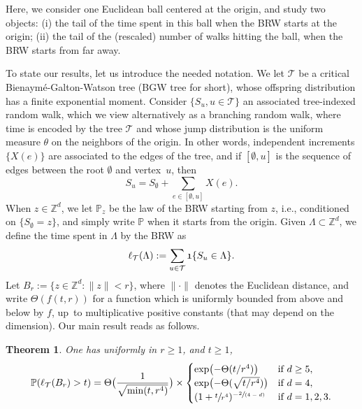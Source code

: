 \documentclass[11pt]{article}
\newcommand{\ie}{i.e.,\xspace}
\numberwithin{equation}{section}
\newcommand{\spfrac}[2]{\sfrac{#1}{(#2)}}
\theoremstyle{plain}
\newtheorem{theorem}{Theorem}[section]
\theoremstyle{definition}
\newcommand\Z{\mathbb{Z}}
\newcommand\T{\mathcal{T}}
\newcommand{\1}{{\text{\Large $\mathfrak 1$}}}
\begin{document}
Here, we consider one Euclidean ball centered at the origin, and study
two objects:
(i) the tail of the time spent in this ball when the
BRW starts at the origin;
(ii) the tail of the (rescaled) number of walks hitting the ball,
when the BRW starts from far away.

To state our results, let us introduce the needed notation. We let $\mathbf {\mathcal T}$ be a critical
Bienaymé-Galton-Watson tree (BGW tree for short),
whose offspring distribution has a finite exponential moment.
Consider $\{S_u, u\in \mathbf {\mathcal T}\}$
an associated tree-indexed random walk,
which we view alternatively as a branching random walk, where
time is encoded by the tree $\mathcal T$ and
whose jump distribution is the uniform measure $\theta$ on the neighbors of the origin.
In other words, independent
increments $\{X(e)\}$ are associated to the edges of the tree, and if
$[\emptyset,u]$ is the sequence of edges between the root $\emptyset$ and
vertex~$u$, then
\[
S_u=S_\emptyset+\sum_{e\in [\emptyset,u]}X(e).
\]
When $z\in \Z^d$, we let $\mathbb P_z$ be the law of the BRW
starting from $z$, \ie conditioned on $\{S_\emptyset=z\}$, and simply write $\mathbb P$ when it starts from the origin.
Given $\Lambda\subset \Z^d$, we define the time spent in $\Lambda$ by the BRW as
\begin{equation*}%
\ell_{\T}(\Lambda) := \sum_{u\in \mathcal T}
\1\{S_u \in \Lambda\}.
\end{equation*}
Let $B_r:=\{z\in \Z^d : \|z\|< r\}$, where $\|{\cdot}\|$
denotes the Euclidean distance, and
write $\Theta(f(t,r))$ for a function which is uniformly
bounded from above and below by $f$, up~to
multiplicative positive constants (that may depend on the dimension). Our main result reads as follows.

\begin{theorem} \label{theo.main}
One has uniformly in $r\ge 1$, and $t\ge 1$,
\begin{equation*}%
\mathbb P(\ell_{\T}(B_r) > t) =
\Theta\bigl(\frac{1}{\sqrt{\min(t,r^4)}}\bigr) \times
\begin{cases}
\exp \bigl(-\Theta(t/r^4)\bigr) & \text{if }d\ge 5, \\
\exp\bigl(- \Theta(\sqrt{ t/r^4})\bigr) & \text{if }d=4,\\
(1+\sfrac t{r^4})^{-\spfrac{2}{4-d}} & \text{if }d=1,2,3.
\end{cases}
\end{equation*}
\end{theorem}
\end{document}
